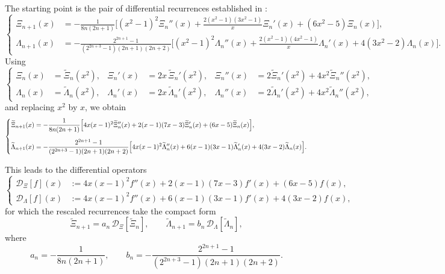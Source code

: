 \documentclass[11pt,twoside]{article}
\numberwithin{equation}{section}
\begin{document}
The starting point is the pair of differential recurrences established in \cite{TallaWaffo2026arxiv2602.16761}:
\[
\left\{
\begin{aligned}
\Xi_{n+1}(x)
&=
-\frac{1}{8n(2n+1)}
\Biggl[
(x^2-1)^2\Xi_n''(x)
+\frac{2(x^2-1)(3x^2-1)}{x}\Xi_n'(x)
+(6x^2-5)\Xi_n(x)
\Biggr],\\[1.2ex]
\Lambda_{n+1}(x)
&=
-\frac{2^{2n+1}-1}{(2^{2n+3}-1)(2n+1)(2n+2)}
\Biggl[
(x^2-1)^2\Lambda_n''(x)
+\frac{2(x^2-1)(4x^2-1)}{x}\Lambda_n'(x)
+4(3x^2-2)\Lambda_n(x)
\Biggr].
\end{aligned}
\right.
\]
Using
\[
\left\{
\begin{aligned}
\Xi_n(x)&=\widetilde{\Xi}_n(x^2),&
\Xi_n'(x)&=2x\,\widetilde{\Xi}_n'(x^2),&
\Xi_n''(x)&=2\widetilde{\Xi}_n'(x^2)+4x^2\widetilde{\Xi}_n''(x^2),\\[0.8ex]
\Lambda_n(x)&=\widetilde{\Lambda}_n(x^2),&
\Lambda_n'(x)&=2x\,\widetilde{\Lambda}_n'(x^2),&
\Lambda_n''(x)&=2\widetilde{\Lambda}_n'(x^2)+4x^2\widetilde{\Lambda}_n''(x^2),
\end{aligned}
\right.
\]
and replacing \(x^2\) by \(x\), we obtain
\[
\left\{
\begin{aligned}
\widetilde{\Xi}_{n+1}(x)
&=
-\frac{1}{8n(2n+1)}
\Bigl[
4x(x-1)^2\widetilde{\Xi}_n''(x)
+2(x-1)(7x-3)\widetilde{\Xi}_n'(x)
+(6x-5)\widetilde{\Xi}_n(x)
\Bigr],\\[1.2ex]
\widetilde{\Lambda}_{n+1}(x)
&=
-\frac{2^{2n+1}-1}{(2^{2n+3}-1)(2n+1)(2n+2)}
\Bigl[
4x(x-1)^2\widetilde{\Lambda}_n''(x)
+6(x-1)(3x-1)\widetilde{\Lambda}_n'(x)
+4(3x-2)\widetilde{\Lambda}_n(x)
\Bigr].
\end{aligned}
\right.
\]

\vspace{0.2cm}

This leads to the differential operators
\[
\left\{
\begin{aligned}
\mathcal D_{\Xi}[f](x)
&:=
4x(x-1)^2 f''(x)
+2(x-1)(7x-3)f'(x)
+(6x-5)f(x),\\[0.8ex]
\mathcal D_{\Lambda}[f](x)
&:=
4x(x-1)^2 f''(x)
+6(x-1)(3x-1)f'(x)
+4(3x-2)f(x),
\end{aligned}
\right.
\]
for which the rescaled recurrences take the compact form
\[
\widetilde{\Xi}_{n+1}=a_n\,\mathcal D_{\Xi}[\widetilde{\Xi}_n],
\qquad
\widetilde{\Lambda}_{n+1}=b_n\,\mathcal D_{\Lambda}[\widetilde{\Lambda}_n],
\]
where
\[
a_n=-\frac{1}{8n(2n+1)},
\qquad
b_n=-\frac{2^{2n+1}-1}{(2^{2n+3}-1)(2n+1)(2n+2)}.
\]

\vspace{0.2cm}
\end{document}
